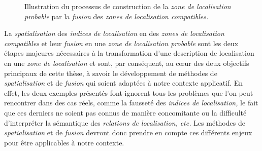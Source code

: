 \begin{figure}
  \centering
  
  \caption{Illustration du processus de construction de la \emph{zone
      de localisation probable} par la \emph{fusion} des \emph{zones
      de localisation compatibles.}}
  \label{fig:obj_fus}
\end{figure}

La \emph{spatialisation} des \emph{indices de localisation} en des
\emph{zones de localisation compatibles} et leur \emph{fusion} en une
\emph{zone de localisation probable} sont les deux étapes majeures
nécessaires à la transformation d'une description de localisation en
une \emph{zone de localisation} et sont, par conséquent, au cœur des
deux objectifs principaux de cette thèse, à savoir le développement de
méthodes de \emph{spatialisation} et de \emph{fusion} qui soient
adaptées à notre contexte applicatif. En effet, les deux exemples
présentés font ignorent tous les problèmes que l'on peut rencontrer
dans des cas réels, comme la fausseté des \emph{indices de
  localisation,} le fait que ces derniers ne soient pas connus de
manière concomitante ou la difficulté d'interpréter la sémantique des
\emph{relations de localisation,} \emph{etc.} Les méthodes de
\emph{spatialisation} et de \emph{fusion} devront donc prendre en
compte ces différents enjeux pour être applicables à notre contexte.


